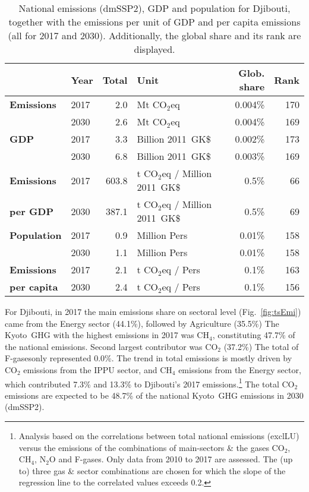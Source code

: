 \documentclass[12pt]{article}
\begin{document}
 \begin{table}[H]
 \centering
 \caption{National emissions (dmSSP2), GDP and population for Djibouti, together with the emissions per unit of GDP and per capita emissions (all for 2017 and 2030). 
 Additionally, the global share and its rank are displayed.}
 \label{tab:overview}
 \begin{tabular}{l || l r l r r}
 \bfseries  & \bfseries Year & \bfseries Total & \bfseries Unit & \bfseries Glob. share & \bfseries Rank \tabularnewline \hline \hline
 \bfseries Emissions & 2017 & 2.0 & Mt CO$_2$eq & 0.004\% & 170 \tabularnewline 
 \bfseries  & 2030 & 2.6 & Mt CO$_2$eq & 0.004\% & 169 \tabularnewline \hline
 \bfseries GDP & 2017 & 3.3 & Billion 2011~GK\$ & 0.002\% & 173 \tabularnewline 
 \bfseries  & 2030 & 6.8 & Billion 2011~GK\$ & 0.003\% & 169 \tabularnewline \hline
 \bfseries Emissions & 2017 & 603.8 & t CO$_2$eq / Million 2011~GK\$ & 0.5\% & 66 \tabularnewline 
 \bfseries per GDP & 2030 & 387.1 & t CO$_2$eq / Million 2011~GK\$ & 0.5\% & 69 \tabularnewline \hline
 \bfseries Population & 2017 & 0.9 & Million Pers & 0.01\% & 158 \tabularnewline 
 \bfseries  & 2030 & 1.1 & Million Pers & 0.01\% & 158 \tabularnewline \hline
 \bfseries Emissions & 2017 & 2.1 & t CO$_2$eq /  Pers & 0.1\% & 163 \tabularnewline 
 \bfseries per capita & 2030 & 2.4 & t CO$_2$eq /  Pers & 0.1\% & 156 \tabularnewline 
 \end{tabular}
 \end{table}

 For Djibouti, in 2017 the main emissions share on sectoral level (Fig.~\ref{fig:tsEmi}) came from the Energy sector (44.1\%), followed by Agriculture (35.5\%)
 The Kyoto~GHG with the highest emissions in 2017 was CH$_4$, constituting  47.7\% of the national emissions. 
 Second largest contributor was CO$_2$ (37.2\%)
 The total of F-gasesonly represented 0.0\%.
 The trend in total emissions is mostly driven by CO$_2$ emissions from the IPPU sector, and CH$_4$ emissions from the Energy sector, which contributed 7.3\% and 13.3\% to Djibouti's 2017 emissions.\footnote{Analysis based on the correlations between total national emissions (exclLU) versus the emissions of the combinations of main-sectors \& the gases CO$_2$, CH$_4$, N$_2$O and F-gases. 
 Only data from 2010 to 2017 are assessed. 
 The (up to) three gas \& sector combinations are chosen for which the slope of the regression line to the correlated values exceeds 0.2.}
 The total CO$_2$ emissions are expected to be 48.7\% of the national Kyoto~GHG emissions in 2030 (dmSSP2).
\end{document}
